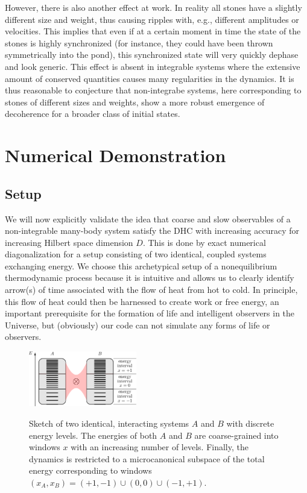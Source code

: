 \documentclass[pre,onecolumn,12pt,aps,longbibliography,nofootinbib]{revtex4-2}
\begin{document}
However, there is also another effect at work. In reality all stones have a slightly different size and weight, thus causing ripples with, e.g., different amplitudes or velocities. This implies that even if at a certain moment in time the state of the stones is highly synchronized (for instance, they could have been thrown symmetrically into the pond), this synchronized state will very quickly dephase and look generic. This effect is absent in integrable systems where the extensive amount of conserved quantities causes many regularities in the dynamics. It is thus reasonable to conjecture that non-integrabe systems, here corresponding to stones of different sizes and weights, show a more robust emergence of decoherence for a broader class of initial states.

\section{Numerical Demonstration}
\label{sec numerics}

\subsection{Setup}

We will now explicitly validate the idea that coarse and slow observables of a non-integrable many-body system satisfy 
the DHC with increasing accuracy for increasing Hilbert space dimension $D$. This is done by exact numerical 
diagonalization for a setup consisting of two identical, coupled systems exchanging energy. We choose this
archetypical setup of a nonequilibrium thermodynamic process because it is intuitive and allows us to clearly identify
arrow(s) of time associated with the flow of heat from hot to cold. In principle, this flow of heat could then be
harnessed to create work or free energy, an important prerequisite for the formation of life and intelligent observers
in the Universe, but (obviously) our code can not simulate any forms of life or observers.

\begin{figure}[t]
 \centering\includegraphics[width=0.42\textwidth,clip=true]{sketch_setup_v2.pdf}
 \label{fig sketch setup}
 \caption{Sketch of two identical, interacting systems $A$ and $B$ with discrete energy levels. The energies of both $A$ and $B$ are coarse-grained into windows $x$ with an increasing number of levels. Finally, the dynamics is restricted to a microcanonical subspace of the total energy corresponding to windows $(x_A,x_B) = (+1,-1) \cup (0,0) \cup (-1,+1)$.}
\end{figure}
\end{document}
